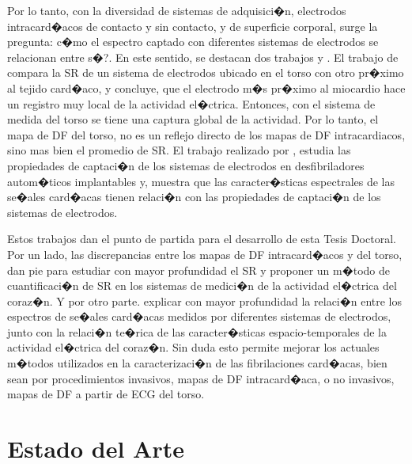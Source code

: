 Por lo tanto, con la diversidad de sistemas de adquisici�n, electrodos
intracard�acos de contacto y sin contacto, y de superficie corporal, surge la
pregunta: c�mo el espectro captado con diferentes sistemas de electrodos se
relacionan entre s�?. En este sentido, se destacan dos trabajos  \cite{lemay08}
y \cite{Requena08}. El trabajo de \cite{lemay08} compara la \ac{SR} de un
sistema de electrodos ubicado en el torso con otro pr�ximo al tejido card�aco, y
concluye, que el electrodo  m�s pr�ximo al miocardio hace un registro muy local
de la actividad el�ctrica.  Entonces, con el sistema de medida del torso se
tiene una captura global de la actividad.  Por lo tanto, el mapa de \ac{DF} del
torso, no es un reflejo directo de los mapas de \ac{DF} intracardiacos, sino mas
bien el promedio de \ac{SR}. El trabajo realizado por \cite{Requena08}, estudia
las propiedades de captaci�n de los sistemas de electrodos en desfibriladores
autom�ticos implantables y, muestra que las caracter�sticas espectrales de las
se�ales card�acas tienen relaci�n con las propiedades de captaci�n de los
sistemas de electrodos.

Estos trabajos dan el punto de partida para el desarrollo de esta Tesis
Doctoral. Por un lado, las discrepancias entre los mapas de \ac{DF}
intracard�acos y del torso, dan pie para estudiar con mayor profundidad el
\ac{SR} y proponer un m�todo de cuantificaci�n de \ac{SR} en los sistemas de
medici�n de la actividad el�ctrica del coraz�n. Y por otro parte. explicar con
mayor profundidad la relaci�n entre los espectros de se�ales card�acas medidos
por diferentes sistemas de electrodos, junto con la relaci�n te�rica de las
caracter�sticas espacio-temporales de la actividad el�ctrica del coraz�n. Sin
duda esto permite mejorar los actuales m�todos utilizados en la caracterizaci�n
de las fibrilaciones card�acas, bien sean por procedimientos invasivos, mapas de
\ac{DF} intracard�aca, o no invasivos, mapas de \ac{DF} a partir de ECG del
torso.




\section{Estado del Arte}

